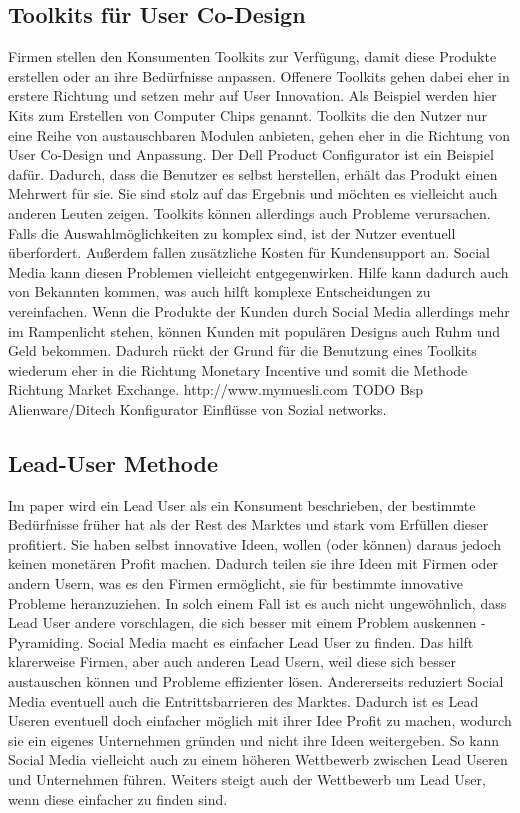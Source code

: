 \subsection{Toolkits f\"ur User Co-Design}
Firmen stellen den Konsumenten Toolkits zur Verf\"ugung, damit diese Produkte erstellen oder an ihre Bed\"urfnisse anpassen. Offenere Toolkits gehen dabei eher in erstere Richtung und setzen mehr auf User Innovation. Als Beispiel werden hier Kits zum Erstellen von Computer Chips genannt. Toolkits die den Nutzer nur eine Reihe von austauschbaren Modulen anbieten, gehen eher in die Richtung von User Co-Design und Anpassung. Der Dell Product Configurator ist ein Beispiel daf\"ur. Dadurch, dass die Benutzer es selbst herstellen, erh\"alt das Produkt einen Mehrwert f\"ur sie. Sie sind stolz auf das Ergebnis und m\"ochten es vielleicht auch anderen Leuten zeigen.
Toolkits k\"onnen allerdings auch Probleme verursachen. Falls die Auswahlm\"oglichkeiten zu komplex sind, ist der Nutzer eventuell \"uberfordert. Au\ss{}erdem fallen zus\"atzliche Kosten f\"ur Kundensupport an. Social Media kann diesen Problemen vielleicht entgegenwirken. Hilfe kann dadurch auch von Bekannten kommen, was auch hilft komplexe Entscheidungen zu vereinfachen.
Wenn die Produkte der Kunden durch Social Media allerdings mehr im Rampenlicht stehen, k\"onnen Kunden mit popul\"aren Designs auch Ruhm und Geld bekommen. Dadurch r\"uckt der Grund f\"ur die Benutzung eines Toolkits wiederum eher in die Richtung Monetary Incentive und somit die Methode Richtung Market Exchange.
http://www.mymuesli.com
TODO
Bsp Alienware/Ditech Konfigurator
Einfl\"usse von Sozial networks.
\subsection{Lead-User Methode}
Im paper wird ein Lead User als ein Konsument beschrieben, der bestimmte Bed\"urfnisse fr\"uher hat als der Rest des Marktes und stark vom Erf\"ullen dieser profitiert. Sie haben selbst innovative Ideen, wollen (oder k\"onnen) daraus jedoch keinen monet\"aren Profit machen. Dadurch teilen sie ihre Ideen mit Firmen oder andern Usern, was es den Firmen erm\"oglicht, sie f\"ur bestimmte innovative Probleme heranzuziehen. In solch einem Fall ist es auch nicht ungew\"ohnlich, dass Lead User andere vorschlagen, die sich besser mit einem Problem auskennen - Pyramiding.
Social Media macht es einfacher Lead User zu finden. Das hilft klarerweise Firmen, aber auch anderen Lead Usern, weil diese sich besser austauschen k\"onnen und Probleme effizienter l\"osen. Andererseits reduziert Social Media eventuell auch die Entrittsbarrieren des Marktes. Dadurch ist es Lead Useren eventuell doch einfacher m\"oglich mit ihrer Idee Profit zu machen, wodurch sie ein eigenes Unternehmen gr\"unden und nicht ihre Ideen weitergeben. So kann Social Media vielleicht auch zu einem h\"oheren Wettbewerb zwischen Lead Useren und Unternehmen f\"uhren. Weiters steigt auch der Wettbewerb um Lead User, wenn diese einfacher zu finden sind.













